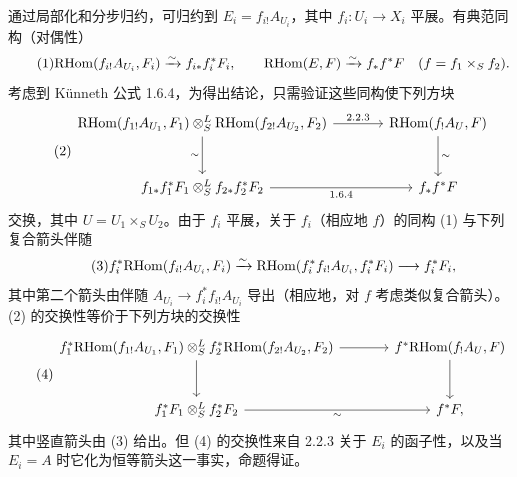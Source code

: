 通过局部化和分步归约，可归约到 $E_i=f_{i!}A_{U_i}$，其中 $f_i:U_i\to X_i$ 平展。有典范同构（对偶性）
\begin{equation}\tag{1}
\mathrm{RHom}(f_{i!}A_{U_i},F_i)\xrightarrow{\sim}f_{i*}f_i^{*}F_i,
\qquad
\mathrm{RHom}(E,F)\xrightarrow{\sim}f_{*}f^{*}F\quad(f=f_1\times_S f_2).
\end{equation}
考虑到 Künneth 公式 1.6.4，为得出结论，只需验证这些同构使下列方块
\begin{equation}\tag{2}
\begin{tikzcd}[column sep=large,row sep=large]
\RHom(f_{1!}A_{U_1},F_1)\otimes^{L}_{S}\RHom(f_{2!}A_{U_2},F_2) \arrow[r,"2.2.3"] \arrow[d,"\sim"'] & \RHom(f_{!}A_U,F) \arrow[d,"\sim"]\\
f_{1*}f_1^{*}F_1\otimes^{L}_{S}f_{2*}f_2^{*}F_2 \arrow[r,"1.6.4"'] & f_{*}f^{*}F
\end{tikzcd}
\end{equation}
交换，其中 $U=U_1\times_SU_2$。由于 $f_i$ 平展，关于 $f_i$（相应地 $f$）的同构 (1) 与下列复合箭头伴随
\begin{equation}\tag{3}
f_i^{*}\mathrm{RHom}(f_{i!}A_{U_i},F_i)\xrightarrow{\sim}\mathrm{RHom}(f_i^{*}f_{i!}A_{U_i},f_i^{*}F_i)\longrightarrow f_i^{*}F_i,
\end{equation}
其中第二个箭头由伴随 $A_{U_i}\to f_i^{*}f_{i!}A_{U_i}$ 导出（相应地，对 $f$ 考虑类似复合箭头）。(2) 的交换性等价于下列方块的交换性
\begin{equation}\tag{4}
\begin{tikzcd}[column sep=large,row sep=large]
f_1^{*}\RHom(f_{1!}A_{U_1},F_1)\otimes^{L}_{S}f_2^{*}\RHom(f_{2!}A_{U_2},F_2) \arrow[r] \arrow[d] & f^{*}\RHom(f_{!}A_U,F) \arrow[d]\\
f_1^{*}F_1\otimes^{L}_{S}f_2^{*}F_2 \arrow[r,"\sim"'] & f^{*}F,
\end{tikzcd}
\end{equation}
其中竖直箭头由 (3) 给出。但 (4) 的交换性来自 2.2.3 关于 $E_i$ 的函子性，以及当 $E_i=A$ 时它化为恒等箭头这一事实，命题得证。

